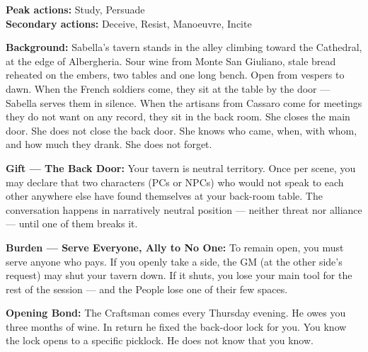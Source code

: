 \textbf{Peak actions:} Study, Persuade\\
\textbf{Secondary actions:} Deceive, Resist, Manoeuvre, Incite

\textbf{Background:} Sabella's tavern stands in the alley climbing
toward the Cathedral, at the edge of Albergheria. Sour wine from
Monte San Giuliano, stale bread reheated on the embers, two
tables and one long bench. Open from vespers to dawn. When the
French soldiers come, they sit at the table by the door --- Sabella
serves them in silence. When the artisans from Cassaro come for
meetings they do not want on any record, they sit in the back room.
She closes the main door. She does not close the back door. She
knows who came, when, with whom, and how much they drank. She does
not forget.

\textbf{Gift --- The Back Door:} Your tavern is neutral territory.
Once per scene, you may declare that two characters (PCs or NPCs)
who would not speak to each other anywhere else have found themselves
at your back-room table. The conversation happens in narratively
neutral position --- neither threat nor alliance --- until one of
them breaks it.

\textbf{Burden --- Serve Everyone, Ally to No One:} To remain open,
you must serve anyone who pays. If you openly take a side, the GM
(at the other side's request) may shut your tavern down. If it shuts,
you lose your main tool for the rest of the session --- and the
People lose one of their few spaces.

\textbf{Opening Bond:} The Craftsman comes every Thursday evening.
He owes you three months of wine. In return he fixed the back-door
lock for you. You know the lock opens to a specific picklock.
He does not know that you know.

\filettodoppio
